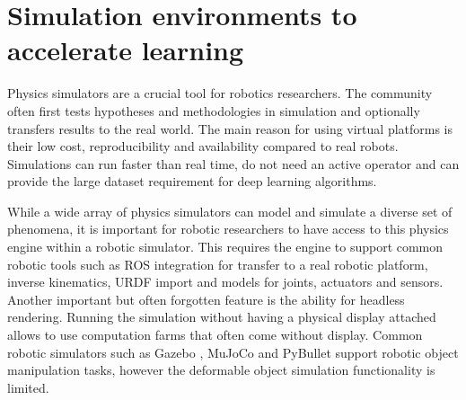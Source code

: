 \documentclass[\home/main.tex]{subfiles}
\begin{document}

\section{Simulation environments to accelerate learning} \label{sec:lit_simulation}

Physics simulators are a crucial tool for robotics researchers. The community often first tests hypotheses and methodologies in simulation and optionally transfers results to the real world. The main reason for using virtual platforms is their low cost, reproducibility and availability compared to real robots. Simulations can run faster than real time, do not need an active operator and can provide the large dataset requirement for deep learning algorithms.

While a wide array of physics simulators can model and simulate a diverse set of phenomena, it is important for robotic researchers to have access to this physics engine within a robotic simulator. This requires the engine to support common robotic tools such as ROS integration for transfer to a real robotic platform, inverse kinematics, URDF import and models for joints, actuators and sensors. Another important but often forgotten feature is the ability for headless rendering. Running the simulation without having a physical display attached allows to use computation farms that often come without display. Common robotic simulators \autocite{review paper robotic simulators} such as Gazebo \autocite{gazebo}, MuJoCo \autocite{mujoco} and PyBullet \autocite{pybullet} support robotic object manipulation tasks, however the deformable object simulation functionality is limited.
\end{document}
